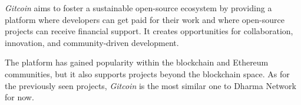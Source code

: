 \textit{Gitcoin} aims to foster a sustainable open-source ecosystem by providing a platform where developers can get paid for their work and where open-source projects can receive financial support. It creates opportunities for collaboration, innovation, and community-driven development.\newline

The platform has gained popularity within the blockchain and Ethereum communities, but it also supports projects beyond the blockchain space. As for the previously seen projects, \textit{Gitcoin} is the most similar one to Dharma Network for now.



	

